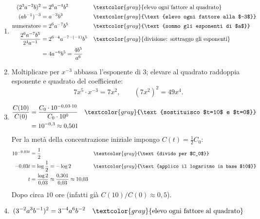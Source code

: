 \begin{question}[ID=1.5, subtitle={Esercizi avanzati sulle potenze}, tags={potenze, esercizi misti}, difficulty=difficile]
\begin{explanation}
\begin{enumerate}
    \[ a^m\cdot a^n=\underbrace{a\cdots a}_{m}\cdot\underbrace{a\cdots a}_{n}=a^{m+n}. \]
    Per estendere agli esponenti negativi si definisce $a^{-n}=\dfrac{1}{a^n}$ (con $a\neq0$). Ad esempio, se $m>n>0$:
    \[ a^m\cdot a^{-n}=\dfrac{a^m}{a^n}=a^{m-n}=a^{m+(-n)}, \]
    perché $n$ fattori del numeratore si semplificano con quelli del denominatore. Gli altri casi si verificano allo stesso modo: la regola resta valida per tutti gli esponenti interi.
    \item \[\begin{aligned}
    (2^3a^{-2}b)^2 &= 2^6a^{-4}b^2 && \textcolor{gray}{\text{elevo ogni fattore al quadrato}}\\
    (ab^{-1})^{-3} &= a^{-3}b^{3} && \textcolor{gray}{\text{elevo ogni fattore alla $-3$}}\\
    \text{numeratore} &= 2^6a^{-7}b^5 && \textcolor{gray}{\text{sommo gli esponenti di $a$}}\\
    \dfrac{2^6a^{-7}b^5}{2^4a^{-1}} &= 2^{6-4}a^{-7-(-1)}b^5 && \textcolor{gray}{\text{divisione: sottraggo gli esponenti}}\\
    &= 4a^{-6}b^5=\dfrac{4b^5}{a^6}
    \end{aligned}\]
    \item Moltiplicare per $x^{-3}$ abbassa l'esponente di $3$; elevare al quadrato raddoppia esponente e quadrato del coefficiente:
    \[ 7x^5\cdot x^{-3}=7x^2, \qquad (7x^2)^2=49x^4. \]
    \item \[\begin{aligned}
    \dfrac{C(10)}{C(0)} &= \dfrac{C_0\cdot10^{-0{,}03\cdot10}}{C_0\cdot10^0} && \textcolor{gray}{\text{sostituisco $t=10$ e $t=0$}}\\
    &= 10^{-0{,}3}\approx0{,}501
    \end{aligned}\]
    Per la metà della concentrazione iniziale impongo $C(t)=\tfrac12C_0$:
    \[\begin{aligned}
    10^{-0{,}03t} &= \dfrac12 && \textcolor{gray}{\text{divido per $C_0$}}\\
    -0{,}03t &= \log\dfrac12=-\log2 && \textcolor{gray}{\text{applico il logaritmo in base $10$}}\\
    t &= \dfrac{\log2}{0{,}03}\approx\dfrac{0{,}301}{0{,}03}\approx10{,}03
    \end{aligned}\]
    Dopo circa $10$ ore (infatti già $C(10)/C(0)\approx0{,}5$).
    \item \[\begin{aligned}
    (3^{-2}a^3b^{-1})^2 &= 3^{-4}a^6b^{-2} && \textcolor{gray}{\text{elevo ogni fattore al quadrato}}\\

\end{aligned}\]
\end{enumerate}
\end{explanation}
\end{question}
